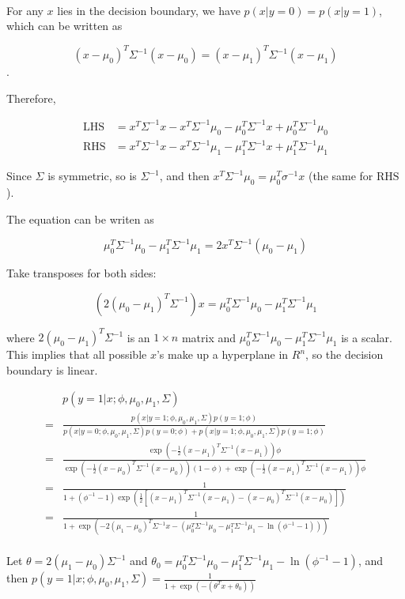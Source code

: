 \begin{answer}
	\\
	For any $x$ lies in the decision boundary, we have $p(x|y=0)=p(x|y=1)$, which can be written as
	
	$$
	(x - \mu_0)^T \Sigma^{-1} (x - \mu_0)=(x - \mu_1)^T \Sigma^{-1} (x - \mu_1)
	$$.
	
	Therefore,
	
	\begin{align*}
		\mathrm{LHS} &= x^T \Sigma^{-1} x - x^T \Sigma^{-1} \mu_0 - \mu_0^T \Sigma^{-1} x + \mu_0^T \Sigma^{-1} \mu_0\\
		\mathrm{RHS} &= x^T \Sigma^{-1} x - x^T \Sigma^{-1} \mu_1 - \mu_1^T \Sigma^{-1} x + \mu_1^T \Sigma^{-1} \mu_1
	\end{align*}
	
	Since $\Sigma$ is symmetric, so is $\Sigma^{-1}$, and then $x^T \Sigma^{-1} \mu_0 = \mu_0^T \sigma^{-1} x$ (the same for $\mathrm{RHS}$).
	
	The equation can be writen as
	
	$$
	\mu_0^T \Sigma^{-1} \mu_0 - \mu_1^T \Sigma^{-1} \mu_1 = 2x^T \Sigma^{-1} (\mu_0 - \mu_1)
	$$
	
	Take transposes for both sides:
	
	$$
	\left(2 (\mu_0 - \mu_1)^T \Sigma^{-1}\right) x = \mu_0^T \Sigma^{-1} \mu_0 - \mu_1^T \Sigma^{-1} \mu_1
	$$
	
	where $2 (\mu_0 - \mu_1)^T \Sigma^{-1}$ is an $1 \times n$ matrix and $\mu_0^T \Sigma^{-1} \mu_0 - \mu_1^T \Sigma^{-1} \mu_1$ is a scalar. This implies that all possible $x$'s make up a hyperplane in $R^n$, so the decision boundary is linear.
	
	\begin{align*}
		& p(y = 1|x; \phi, \mu_0, \mu_1, \Sigma)\\
		= & \frac{p(x|y = 1; \phi, \mu_0, \mu_1, \Sigma)p(y = 1; \phi)}{p(x|y = 0; \phi, \mu_0, \mu_1, \Sigma)p(y = 0; \phi) + p(x|y = 1; \phi, \mu_0, \mu_1, \Sigma)p(y = 1; \phi)}\\
		= & \frac{\exp\left(-\frac{1}{2}(x-\mu_1)^T \Sigma^{-1} (x-\mu_1) \right) \phi}{\exp\left(-\frac{1}{2}(x-\mu_{0})^T \Sigma^{-1} (x-\mu_{0})\right) (1 - \phi) + \exp\left(-\frac{1}{2}(x-\mu_1)^T \Sigma^{-1} (x-\mu_1) \right) \phi}\\
		= & \frac{1}{1 + (\phi^{-1} - 1) \exp\left(\frac{1}{2}\left[(x-\mu_1)^T \Sigma^{-1} (x-\mu_1) - (x-\mu_0)^T \Sigma^{-1} (x-\mu_0)  \right]\right)}\\
		= & \frac{1}{1 + \exp\left(-2 (\mu_1 - \mu_0)^T \Sigma^{-1} x - (\mu_0^T \Sigma^{-1} \mu_0 - \mu_1^T \Sigma^{-1} \mu_1 - \ln (\phi^{-1} - 1))\right)}\\
	\end{align*}
	
	Let $\theta = 2 (\mu_1 - \mu_0) \Sigma^{-1}$ and $\theta_0 = \mu_0^T \Sigma^{-1} \mu_0 - \mu_1^T \Sigma^{-1} \mu_1 - \ln (\phi^{-1} - 1)$, and then $p(y = 1|x; \phi, \mu_0, \mu_1, \Sigma) = \frac{1}{1 + \exp(-(\theta^T x + \theta_0))}$
\end{answer}